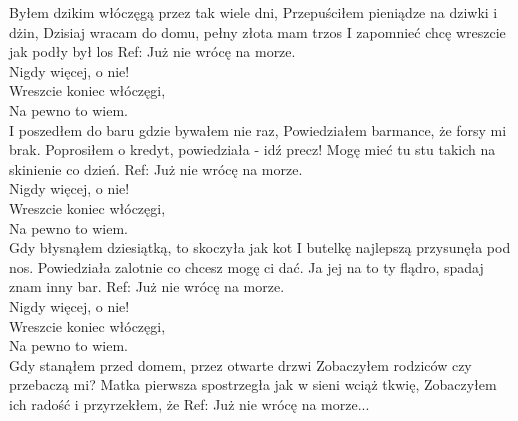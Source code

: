 
\begin{flushleft}
\vskip 3mm
Byłem dzikim włóczęgą przez tak wiele dni, \tab{} \newline
Przepuściłem  pieniądze na dziwki i dżin, \tab{} \newline
Dzisiaj wracam do domu, pełny złota mam trzos \newline
I zapomnieć chcę wreszcie jak podły był los \tab{} \newline
\vskip 3mm
Ref: Już nie wrócę na morze. \tab{} \\
\hspace{0.9cm}Nigdy więcej, o nie!\tab{}  \\
\hspace{0.9cm}Wreszcie koniec włóczęgi,\tab{} \\
\hspace{0.9cm}Na pewno to wiem. \tab{}  \\
\vskip 3mm
I poszedłem do baru gdzie bywałem nie raz, \newline
Powiedziałem barmance, że forsy mi brak. \newline
Poprosiłem o kredyt, powiedziała - idź precz! \newline
Mogę mieć tu stu  takich na skinienie co dzień. \newline
\vskip 3mm
Ref: Już nie wrócę na morze.\\
\hspace{0.9cm}Nigdy więcej, o nie! \\
\hspace{0.9cm}Wreszcie koniec włóczęgi,\\
\hspace{0.9cm}Na pewno to wiem.\\
\vskip 3mm
Gdy błysnąłem dziesiątką, to skoczyła jak kot \newline
I butelkę najlepszą przysunęła pod nos.  \newline
Powiedziała zalotnie co chcesz mogę ci dać. \newline
Ja jej na to ty flądro, spadaj znam inny bar. \newline
\vskip 3mm
Ref: Już nie wrócę na morze.\\
\hspace{0.9cm}Nigdy więcej, o nie! \\
\hspace{0.9cm}Wreszcie koniec włóczęgi,\\
\hspace{0.9cm}Na pewno to wiem.\\
\vskip 3mm
Gdy stanąłem przed domem, przez otwarte drzwi \newline
Zobaczyłem rodziców czy przebaczą mi? \newline
Matka pierwsza spostrzegła jak w sieni wciąż tkwię, \newline
Zobaczyłem ich radość i przyrzekłem, że \newline
\vskip 3mm
Ref: Już nie wrócę na morze...\\
\vskip 3mm
\end{flushleft}
\clearpage
